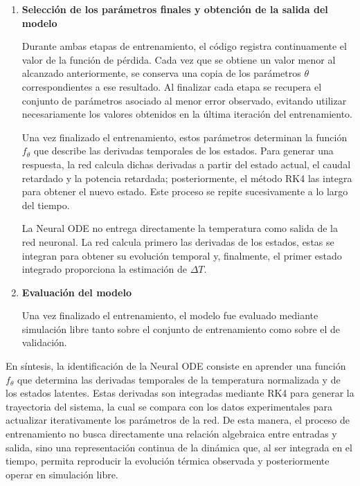 \documentclass[11pt]{report}
\begin{document}
\begin{enumerate}
\item \textbf{Selección de los parámetros finales y obtención de la salida del modelo}

Durante ambas etapas de entrenamiento, el código registra continuamente el valor de la función de pérdida. Cada vez que se obtiene un valor menor al alcanzado anteriormente, se conserva una copia de los parámetros $\theta$ correspondientes a ese resultado. Al finalizar cada etapa se recupera el conjunto de parámetros asociado al menor error observado, evitando utilizar necesariamente los valores obtenidos en la última iteración del entrenamiento.

Una vez finalizado el entrenamiento, estos parámetros determinan la función $f_\theta$ que describe las derivadas temporales de los estados. Para generar una respuesta, la red calcula dichas derivadas a partir del estado actual, el caudal retardado y la potencia retardada; posteriormente, el método RK4 las integra para obtener el nuevo estado. Este proceso se repite sucesivamente a lo largo del tiempo.

La Neural ODE no entrega directamente la temperatura como salida de la red neuronal. La red calcula primero las derivadas de los estados, estas se integran para obtener su evolución temporal y, finalmente, el primer estado integrado proporciona la estimación de $\Delta T$.

\item \textbf{Evaluación del modelo}

Una vez finalizado el entrenamiento, el modelo fue evaluado mediante simulación libre tanto sobre el conjunto de entrenamiento como sobre el de validación. %


\end{enumerate}

En síntesis, la identificación de la Neural ODE consiste en aprender una función $f_\theta$ que determina las derivadas temporales de la temperatura normalizada y de los estados latentes. Estas derivadas son integradas mediante RK4 para generar la trayectoria del sistema, la cual se compara con los datos experimentales para actualizar iterativamente los parámetros de la red. De esta manera, el proceso de entrenamiento no busca directamente una relación algebraica entre entradas y salida, sino una representación continua de la dinámica que, al ser integrada en el tiempo, permita reproducir la evolución térmica observada y posteriormente operar en simulación libre.
\end{document}

